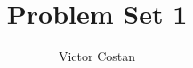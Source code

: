 \documentclass{article}
\newcommand{\PsetAuthorName}{Victor Costan}
\newcommand{\PsetTitle}{Problem Set 1}
\newcommand{\PsetMainFile}{6.823/ps1/all.tex}
\begin{document}
\title{\PsetClassNumber\space\PsetClassTerm\space\PsetTitle}
\author{\PsetAuthorName}
\maketitle


\end{document}
